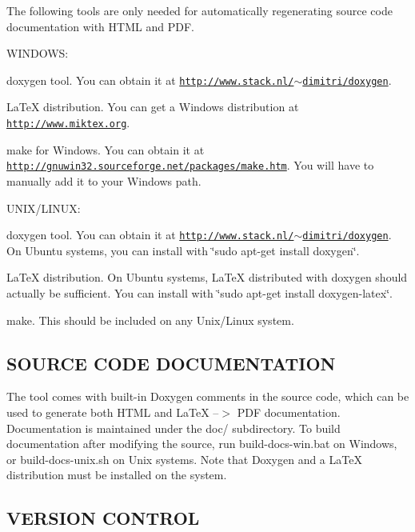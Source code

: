The following tools are only needed for automatically regenerating source code documentation with H\+T\+M\+L and P\+D\+F.

W\+I\+N\+D\+O\+W\+S\+:


\begin{DoxyItemize}
\item doxygen tool. You can obtain it at \href{http://www.stack.nl/~dimitri/doxygen}{\tt http\+://www.\+stack.\+nl/$\sim$dimitri/doxygen}.
\item La\+Te\+X distribution. You can get a Windows distribution at \href{http://www.miktex.org}{\tt http\+://www.\+miktex.\+org}.
\item make for Windows. You can obtain it at \href{http://gnuwin32.sourceforge.net/packages/make.htm}{\tt http\+://gnuwin32.\+sourceforge.\+net/packages/make.\+htm}. You will have to manually add it to your Windows path.
\end{DoxyItemize}

U\+N\+I\+X/\+L\+I\+N\+U\+X\+:


\begin{DoxyItemize}
\item doxygen tool. You can obtain it at \href{http://www.stack.nl/~dimitri/doxygen}{\tt http\+://www.\+stack.\+nl/$\sim$dimitri/doxygen}. On Ubuntu systems, you can install with \char`\"{}sudo apt-\/get install doxygen\char`\"{}.
\item La\+Te\+X distribution. On Ubuntu systems, La\+Te\+X distributed with doxygen should actually be sufficient. You can install with \char`\"{}sudo apt-\/get install doxygen-\/latex\char`\"{}.
\item make. This should be included on any Unix/\+Linux system. 

 \subsection*{S\+O\+U\+R\+C\+E C\+O\+D\+E D\+O\+C\+U\+M\+E\+N\+T\+A\+T\+I\+O\+N }
\end{DoxyItemize}

The tool comes with built-\/in Doxygen comments in the source code, which can be used to generate both H\+T\+M\+L and La\+Te\+X --$>$ P\+D\+F documentation. Documentation is maintained under the doc/ subdirectory. To build documentation after modifying the source, run build-\/docs-\/win.\+bat on Windows, or build-\/docs-\/unix.\+sh on Unix systems. Note that Doxygen and a La\+Te\+X distribution must be installed on the system. 

 \subsection*{V\+E\+R\+S\+I\+O\+N C\+O\+N\+T\+R\+O\+L }

